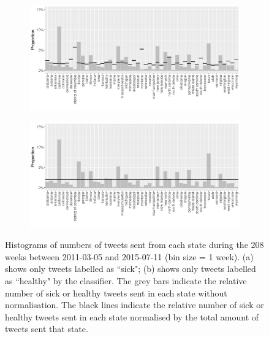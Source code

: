 \documentclass[11pt, a4paper,twoside]{report}\usepackage[]{graphicx}\usepackage[]{color}
\begin{document}
\begin{figure}[htbp!]
\centering
  \begin{subfigure}[t]{1\textwidth}
  \includegraphics[width=1\linewidth]{20_activity_sick_statename_Twitter_full_aggregatedoverlay.pdf}
  \caption{}
  \end{subfigure}
\hfill
  \begin{subfigure}[t]{1\textwidth}
  \includegraphics[width=1\linewidth]{21_activity_healthy_statename_Twitter_full_aggregatedoverlay.pdf}
  \caption{}
  \end{subfigure}
  
  \caption{Histograms of numbers of tweets sent from each state during the 208 weeks between 2011-03-05 and 2015-07-11 (bin size = 1 week). (a) shows only tweets labelled as ``sick"; (b) shows only tweets labelled as ``healthy" by the classifier. The grey bars indicate the relative number of sick or healthy tweets sent in each state without normalisation. The black lines indicate the relative number of sick or healthy tweets sent in each state normalised by the total amount of tweets sent that state.}
  \label{fig:tweets_state_healthy_sick}
\end{figure}
\end{document}
